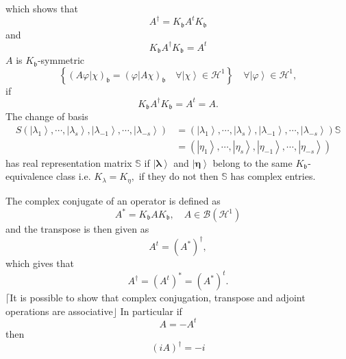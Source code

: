 \documentclass[aps,preprint]{revtex4}%
\begin{document}
which shows that
\begin{equation}
A^{\dagger}=K_{\mathfrak{b}}A^{t}K_{\mathfrak{b}}%
\end{equation}
and
\begin{equation}
K_{\mathfrak{b}}A^{\dagger}K_{\mathfrak{b}}=A^{t}%
\end{equation}
$A$ is $K_{\mathfrak{b}}$-symmetric%
\begin{equation}
\left\{  \left(  \left.  A\varphi\right\vert \chi\right)  _{\mathfrak{b}%
}=\left(  \left.  \varphi\right\vert A\chi\right)  _{\mathfrak{b}}\quad
\forall\left\vert \chi\right\rangle \in\mathcal{H}^{1}\right\}  \quad
\forall\left\vert \varphi\right\rangle \in\mathcal{H}^{1},
\end{equation}
if
\begin{equation}
K_{\mathfrak{b}}A^{\dagger}K_{\mathfrak{b}}=A^{t}=A.
\end{equation}
The change of basis
\begin{align}
S\left(  \left\vert \lambda_{1}\right\rangle ,\cdots,\left\vert \lambda
_{s}\right\rangle ,\left\vert \lambda_{-1}\right\rangle ,\cdots,\left\vert
\lambda_{-s}\right\rangle \right)   &  =\left(  \left\vert \lambda
_{1}\right\rangle ,\cdots,\left\vert \lambda_{s}\right\rangle ,\left\vert
\lambda_{-1}\right\rangle ,\cdots,\left\vert \lambda_{-s}\right\rangle
\right)  \mathbb{S}\nonumber\\
&  =\left(  \left\vert \eta_{1}\right\rangle ,\cdots,\left\vert \eta
_{s}\right\rangle ,\left\vert \eta_{-1}\right\rangle ,\cdots,\left\vert
\eta_{-s}\right\rangle \right)
\end{align}
has real representation matrix $\mathbb{S}$ if $\left\vert \mathbf{\lambda
}\right\rangle $ and $\left\vert \mathbf{\eta}\right\rangle $ belong to the
same $K_{\mathfrak{b}}$-equivalence class i.e. $K_{\lambda}=K_{\eta},$ if they
do not then $\mathbb{S}$ has complex entries.

The complex conjugate of an operator is defined as
\begin{equation}
A^{\ast}=K_{\mathfrak{b}}AK_{\mathfrak{b}},\quad A\in\mathcal{B}\left(
\mathcal{H}^{1}\right)
\end{equation}
and the transpose is then given as
\begin{equation}
A^{t}=\left(  A^{\ast}\right)  ^{\dagger},
\end{equation}
which gives that
\begin{equation}
A^{\dagger}=\left(  A^{t}\right)  ^{\ast}=\left(  A^{\ast}\right)  ^{t}.
\end{equation}
$\lceil$It is possible to show that complex conjugation, transpose and adjoint
operations are associative$\rfloor$ In particular if
\begin{equation}
A=-A^{t}%
\end{equation}
then
\begin{equation}
\left(  iA\right)  ^{\dagger}=-i
\end{equation}
\end{document}
